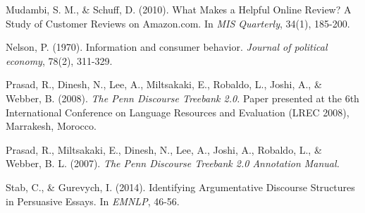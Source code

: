 \documentclass[
    a4paper,%
    12pt,%
    oneside,%
    toc=bibliography,
    final,
]{scrartcl}
\begin{document}
\begin{thebibliography}{9}
 Mudambi, S. M., \& Schuff, D. (2010). What Makes a Helpful Online Review? A Study of Customer Reviews on Amazon.com. In \textit{MIS Quarterly}, 34(1), 185-200.

Nelson, P. (1970). Information and consumer behavior. \textit{Journal of political economy}, 78(2), 311-329.

Prasad, R., Dinesh, N., Lee, A., Miltsakaki, E., Robaldo, L., Joshi, A., \& Webber, B. (2008). \textit{The Penn Discourse Treebank 2.0.} Paper presented at the 6th International Conference on Language Resources and Evaluation (LREC 2008), Marrakesh, Morocco.

Prasad, R., Miltsakaki, E., Dinesh, N., Lee, A., Joshi, A., Robaldo, L., \& Webber, B. L. (2007). \textit{The Penn Discourse Treebank 2.0 Annotation Manual.}

Stab, C., \& Gurevych, I. (2014). Identifying Argumentative Discourse Structures in Persuasive Essays. In \textit{EMNLP}, 46-56.

\end{thebibliography}
\end{document}
